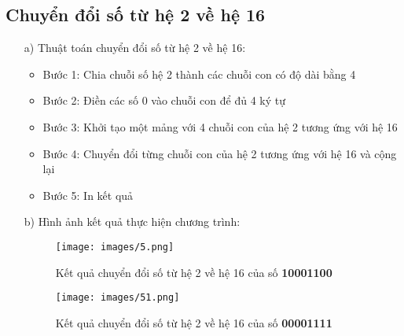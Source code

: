 \documentclass[20pt]{article}
\begin{document}
\subsection{Chuyển đổi số từ hệ 2 về hệ 16}
\begin{enumerate}
    \item[a)] Thuật toán chuyển đổi số từ hệ 2 về hệ 16:
    \begin{itemize}
        \item Bước 1: Chia chuỗi số hệ 2 thành các chuỗi con có độ dài bằng 4
        \item Bước 2: Điền các số 0 vào chuỗi con để đủ 4 ký tự
        \item Bước 3: Khởi tạo một mảng với 4 chuỗi con của hệ 2 tương ứng với hệ 16
        \item Bước 4: Chuyển đổi từng chuỗi con của hệ 2 tương ứng với hệ 16 và cộng lại
        \item Bước 5: In kết quả
    \end{itemize}
    \item[b)] Hình ảnh kết quả thực hiện chương trình:
    \begin{figure}[H]
        \centering
        \texttt{[image: images/5.png]}
        \caption{Kết quả chuyển đổi số từ hệ 2 về hệ 16 của số \textbf{10001100}}
        \label{fig:my_label}
    \end{figure}
    \begin{figure}[H]
        \centering
        \texttt{[image: images/51.png]}
        \caption{Kết quả chuyển đổi số từ hệ 2 về hệ 16 của số \textbf{00001111}}
        \label{fig:my_label}
    \end{figure}
\end{enumerate}
\end{document}
